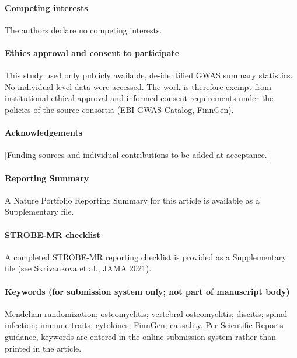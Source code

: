 \documentclass[11pt]{article}
\begin{document}
\paragraph{Competing interests} The authors declare no competing interests.
\paragraph{Ethics approval and consent to participate} This study used only publicly available, de-identified GWAS summary statistics. No individual-level data were accessed. The work is therefore exempt from institutional ethical approval and informed-consent requirements under the policies of the source consortia (EBI GWAS Catalog, FinnGen).
\paragraph{Acknowledgements} [Funding sources and individual contributions to be added at acceptance.]
\paragraph{Reporting Summary} A Nature Portfolio Reporting Summary for this article is available as a Supplementary file.
\paragraph{STROBE-MR checklist} A completed STROBE-MR reporting checklist is provided as a Supplementary file (see Skrivankova et al., JAMA 2021).
\paragraph{Keywords (for submission system only; not part of manuscript body)} Mendelian randomization; osteomyelitis; vertebral osteomyelitis; discitis; spinal infection; immune traits; cytokines; FinnGen; causality. Per Scientific Reports guidance, keywords are entered in the online submission system rather than printed in the article.
\end{document}
